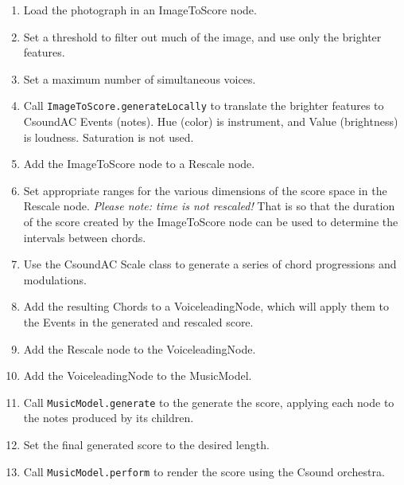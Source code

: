 \documentclass[letterpaper,10pt,DIV=12,parskip=half]{scrartcl}
\begin{document}
\begin{enumerate}
\item Load the photograph in an ImageToScore node.
\item Set a threshold to filter out much of the image, and use only the brighter features.
\item Set a maximum number of simultaneous voices.
\item Call \lstinline|ImageToScore.generateLocally| to translate the brighter features to CsoundAC Events (notes). Hue (color) is instrument, and Value (brightness) is loudness. Saturation is not used.
\item Add the ImageToScore node to a Rescale node.
\item Set appropriate ranges for the various dimensions of the score space in the Rescale node. \emph{Please note: time is not rescaled!} That is so that the duration of the score created by the ImageToScore node can be used to determine the intervals between chords.
\item Use the CsoundAC Scale class to generate a series of chord progressions and modulations.
\item Add the resulting Chords to a VoiceleadingNode, which will apply them to the Events in the generated and rescaled score.
\item Add the Rescale node to the VoiceleadingNode.
\item Add the VoiceleadingNode to the MusicModel.
\item Call \lstinline|MusicModel.generate| to the generate the score, applying each node to the notes produced by its children.
\item Set the final generated score to the desired length.
\item Call \lstinline|MusicModel.perform| to render the score using the Csound orchestra.
\end{enumerate}
\end{document}

